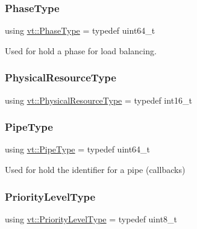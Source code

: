 \mbox{\label{namespacevt_a46ce6733d5cdbd735d561b7b4029f6d7}} 
\subsubsection{\texorpdfstring{Phase\+Type}{PhaseType}}
{\footnotesize\ttfamily using \hyperlink{namespacevt_a46ce6733d5cdbd735d561b7b4029f6d7}{vt\+::\+Phase\+Type} = typedef uint64\+\_\+t}



Used for hold a phase for load balancing. 

\mbox{\label{namespacevt_a2dc36fcada816dc6d11774d650328ee9}} 
\subsubsection{\texorpdfstring{Physical\+Resource\+Type}{PhysicalResourceType}}
{\footnotesize\ttfamily using \hyperlink{namespacevt_a2dc36fcada816dc6d11774d650328ee9}{vt\+::\+Physical\+Resource\+Type} = typedef int16\+\_\+t}

\mbox{\label{namespacevt_ac9852acda74d1896f48f406cd72c7bd3}} 
\subsubsection{\texorpdfstring{Pipe\+Type}{PipeType}}
{\footnotesize\ttfamily using \hyperlink{namespacevt_ac9852acda74d1896f48f406cd72c7bd3}{vt\+::\+Pipe\+Type} = typedef uint64\+\_\+t}



Used for hold the identifier for a pipe (callbacks) 

\mbox{\label{namespacevt_a53e07fdb3351b0f263e0dfd51b968d5e}} 
\subsubsection{\texorpdfstring{Priority\+Level\+Type}{PriorityLevelType}}
{\footnotesize\ttfamily using \hyperlink{namespacevt_a53e07fdb3351b0f263e0dfd51b968d5e}{vt\+::\+Priority\+Level\+Type} = typedef uint8\+\_\+t}



